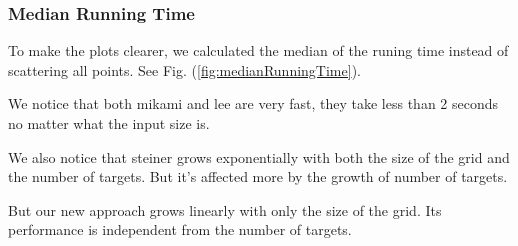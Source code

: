 \subsubsection{Median Running Time}
To make the plots clearer, we calculated the median of the runing time instead of scattering all points. See Fig. (\ref{fig:medianRunningTime}).

We notice that both mikami and lee are very fast, they take less than 2 seconds no matter what the input size is.

We also notice that steiner grows exponentially with both the size of the grid and the number of targets. But it's affected more by the growth of number of targets.

But our new approach grows linearly with only the size of the grid. Its performance is independent from the number of targets.

